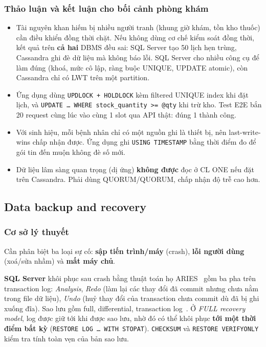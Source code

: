 \subsubsection{Thảo luận và kết luận cho bối cảnh phòng khám}
\begin{itemize}
    \item Tài nguyên khan hiếm bị nhiều người tranh (khung giờ khám, tồn kho thuốc) cần điều khiển đồng thời chặt. Nếu không dùng cơ chế kiểm soát đồng thời, kết quả trên \textbf{cả hai} DBMS đều sai: SQL Server tạo 50 lịch hẹn trùng, Cassandra ghi đè dữ liệu mà không báo lỗi. SQL Server cho nhiều công cụ để làm đúng (khoá, mức cô lập, ràng buộc UNIQUE, UPDATE atomic), còn Cassandra chỉ có LWT trên một partition.
    \item Ứng dụng dùng \texttt{UPDLOCK + HOLDLOCK} kèm filtered UNIQUE index khi đặt lịch, và \texttt{UPDATE \ldots{} WHERE stock\_quantity >= @qty} khi trừ kho. Test E2E bắn 20 request cùng lúc vào cùng 1 slot qua API thật: đúng 1 thành công.
    \item Với sinh hiệu, mỗi bệnh nhân chỉ có một nguồn ghi là thiết bị, nên last-write-wins chấp nhận được. Ứng dụng ghi \texttt{USING TIMESTAMP} bằng thời điểm đo để gói tin đến muộn không đè số mới.
    \item Dữ liệu lâm sàng quan trọng (dị ứng) \textbf{không được} đọc ở CL ONE nếu đặt trên Cassandra. Phải dùng QUORUM/QUORUM, chấp nhận độ trễ cao hơn.
\end{itemize}

\subsection{Data backup and recovery}
\label{sec:backup}

\subsubsection{Cơ sở lý thuyết}
Cần phân biệt ba loại sự cố: \textbf{sập tiến trình/máy} (crash), \textbf{lỗi người dùng} (xoá/sửa nhầm) và \textbf{mất máy chủ}.

\textbf{SQL Server} khôi phục sau crash bằng thuật toán họ ARIES~\cite{aries} gồm ba pha trên transaction log: \textit{Analysis}, \textit{Redo} (làm lại các thay đổi đã commit nhưng chưa nằm trong file dữ liệu), \textit{Undo} (huỷ thay đổi của transaction chưa commit dù đã bị ghi xuống đĩa). Sao lưu gồm full, differential, transaction log~\cite{mssql-backup}. Ở \textit{FULL recovery model}, log được giữ tới khi được sao lưu, nhờ đó có thể khôi phục \textbf{tới một thời điểm bất kỳ} (\texttt{RESTORE LOG \ldots{} WITH STOPAT}). \texttt{CHECKSUM} và \texttt{RESTORE VERIFYONLY} kiểm tra tính toàn vẹn của bản sao lưu.

